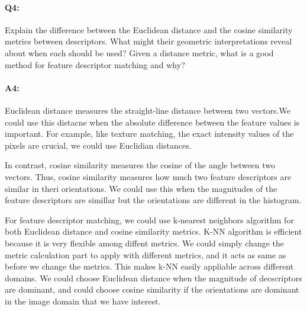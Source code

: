 \pagebreak
\paragraph{Q4:} Explain the difference between the Euclidean distance and the cosine similarity metrics between descriptors. What might their geometric interpretations reveal about when each should be used? Given a distance metric, what is a good method for feature descriptor matching and why?

\paragraph{A4:} Euclidean distance measures the straight-line distance between two vectors.We could use this distacne when the absolute difference between the feature values is important. For example, like texture matching, the exact intensity values of the pixels are crucial, we could use Euclidian distances.

In contrast, cosine similarity measures the cosine of the angle between two vectors. Thus, cosine similarity measures how much two feature descriptors are similar in theri orientations. We could use this when the magnitudes of the feature descriptors are simillar but the orientations are different in the histogram.

For feature descriptor matching, we could use k-nearest neighbors algorithm for both Euclidean distance and cosine similarity metrics. K-NN algorithm is efficient because it is very flexible among diffent metrics. We could simply change the metric calculation part to apply with different metrics, and it acts as same as before we change the metrics. This makes k-NN easily appliable across different domains. We could choose Euclidean distance when the magnitude of decscriptors are dominant, and could choose cosine similarity if the orientations are dominant in the image domain that we have interest.









